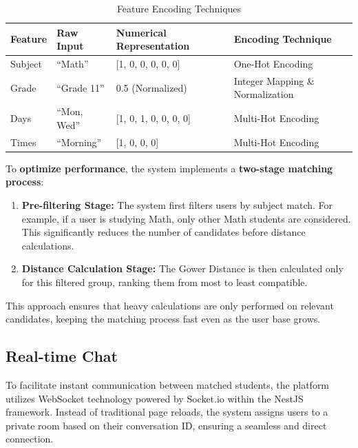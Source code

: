 \documentclass[a4paper,12pt]{report}
\begin{document}

\begin{table}[h!]
\centering
\caption{Feature Encoding Techniques}
\label{tab:feature_encoding}
\renewcommand{\arraystretch}{1.3} %
\begin{tabular}{|p{2cm}|p{2.5cm}|p{5cm}|p{4cm}|}
\hline
\textbf{Feature} & \textbf{Raw Input} & \textbf{Numerical Representation} & \textbf{Encoding Technique} \\ \hline
Subject & ``Math'' & [1, 0, 0, 0, 0, 0] & One-Hot Encoding \\ \hline
Grade & ``Grade 11'' & 0.5 (Normalized) & Integer Mapping \& Normalization \\ \hline
Days & ``Mon, Wed'' & [1, 0, 1, 0, 0, 0, 0] & Multi-Hot Encoding \\ \hline
Times & ``Morning'' & [1, 0, 0, 0] & Multi-Hot Encoding \\ \hline
\end{tabular}
\end{table}


\noindent To \textbf{optimize performance}, the system implements a \textbf{two-stage matching process}:

\begin{enumerate}
    \item \textbf{Pre-filtering Stage:} The system first filters users by subject match. For example, if a user is studying Math, only other Math students are considered. This significantly reduces the number of candidates before distance calculations.
    \item \textbf{Distance Calculation Stage:} The Gower Distance is then calculated only for this filtered group, ranking them from most to least compatible.
\end{enumerate}

\noindent This approach ensures that heavy calculations are only performed on relevant candidates, keeping the matching process fast even as the user base grows.

\subsection{Real-time Chat}

To facilitate instant communication between matched students, the platform utilizes WebSocket technology powered by Socket.io within the NestJS framework. Instead of traditional page reloads, the system assigns users to a private room based on their conversation ID, ensuring a seamless and direct connection.
\end{document}
